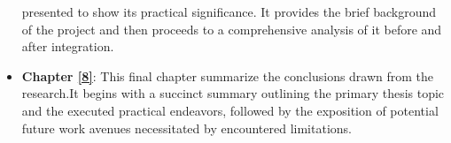 \begin{itemize}
  presented to show its practical significance. It provides the brief background of the project and then proceeds to a comprehensive analysis of it before and after 
  integration.
  \item \textbf{Chapter \hyperref[ch:conclusions]{[8]}}: This final chapter summarize the conclusions drawn from the research.It begins with a succinct summary outlining 
  the primary thesis topic and the executed practical endeavors, followed by the exposition of potential future work avenues necessitated by encountered limitations.
\end{itemize}


